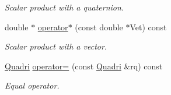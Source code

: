 \begin{DoxyCompactItemize}
\begin{DoxyCompactList}\small\item\em Scalar product with a quaternion. \end{DoxyCompactList}\item 
double $\ast$ \hyperlink{classQuadri_ae1ed8743a6f69bae7fe2fce6e5969e45}{operator$\ast$} (const double $\ast$Vet) const \hypertarget{classQuadri_ae1ed8743a6f69bae7fe2fce6e5969e45}{}\label{classQuadri_ae1ed8743a6f69bae7fe2fce6e5969e45}

\begin{DoxyCompactList}\small\item\em Scalar product with a vector. \end{DoxyCompactList}\item 
\hyperlink{classQuadri}{Quadri} \hyperlink{classQuadri_aa0fe30f9a827de40be66d54c38b45cce}{operator=} (const \hyperlink{classQuadri}{Quadri} \&rq) const \hypertarget{classQuadri_aa0fe30f9a827de40be66d54c38b45cce}{}\label{classQuadri_aa0fe30f9a827de40be66d54c38b45cce}

\begin{DoxyCompactList}\small\item\em Equal operator. \end{DoxyCompactList}\end{DoxyCompactItemize}
